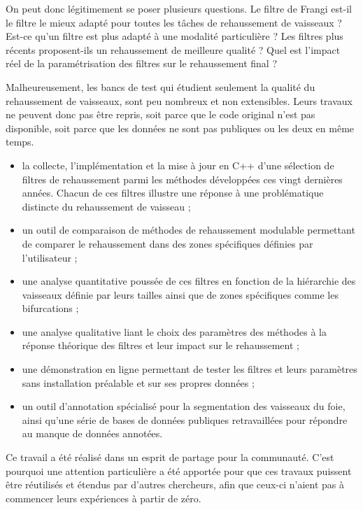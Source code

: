 On peut donc légitimement se poser plusieurs questions. Le filtre de Frangi est-il le filtre le mieux adapté pour toutes les tâches de rehaussement de vaisseaux ? Est-ce qu'un filtre est plus adapté à une modalité particulière ? Les filtres plus récents proposent-ils un rehaussement de meilleure qualité ? Quel est l'impact réel de la paramétrisation des filtres sur le rehaussement final ? 

Malheureusement, les bancs de test qui étudient seulement la qualité du rehaussement de vaisseaux,  sont peu nombreux et non extensibles. Leurs travaux ne peuvent donc pas être repris, soit parce que le code original n'est pas disponible, soit parce que les données ne sont pas publiques ou les deux en même temps. 
\begin{itemize}
\item la collecte, l'implémentation et la mise à jour en C++ d'une sélection de filtres de rehaussement parmi les méthodes développées ces vingt dernières années. Chacun de ces filtres illustre une réponse à une problématique distincte du rehaussement de vaisseau ;
\item un outil de comparaison de méthodes de rehaussement modulable permettant de comparer le rehaussement dans des zones spécifiques définies par l'utilisateur ;
\item une analyse quantitative poussée de ces filtres en fonction de la hiérarchie des vaisseaux définie par leurs tailles ainsi que de zones spécifiques comme les bifurcations ;
\item une analyse qualitative liant le choix des paramètres des méthodes à la réponse théorique des filtres et leur impact sur le rehaussement ;
\item une démonstration en ligne permettant de tester les filtres et leurs paramètres sans installation préalable et sur ses propres données ;
\item un outil d'annotation spécialisé pour la segmentation des vaisseaux du foie, ainsi qu'une série de bases de données publiques retravaillées pour répondre au manque de données annotées.
\end{itemize}
Ce travail a été réalisé dans un esprit de partage pour la communauté. C'est pourquoi une attention particulière a été apportée pour que ces travaux puissent être réutilisés et étendus par d'autres chercheurs, afin que ceux-ci n'aient pas à commencer leurs expériences à partir de zéro.

